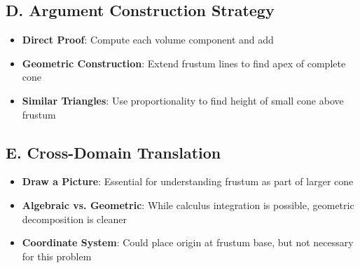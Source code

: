 \documentclass[]{article}
\begin{document}
\begin{strategicbox}
\subsection*{D. Argument Construction Strategy}
\begin{itemize}[leftmargin=*]
    \item \textbf{Direct Proof}: Compute each volume component and add
    \item \textbf{Geometric Construction}: Extend frustum lines to find apex of complete cone
    \item \textbf{Similar Triangles}: Use proportionality to find height of small cone above frustum
\end{itemize}

\subsection*{E. Cross-Domain Translation}
\begin{itemize}[leftmargin=*]
    \item \textbf{Draw a Picture}: Essential for understanding frustum as part of larger cone
    \item \textbf{Algebraic vs. Geometric}: While calculus integration is possible, geometric decomposition is cleaner
    \item \textbf{Coordinate System}: Could place origin at frustum base, but not necessary for this problem
\end{itemize}
\end{strategicbox}
\end{document}
